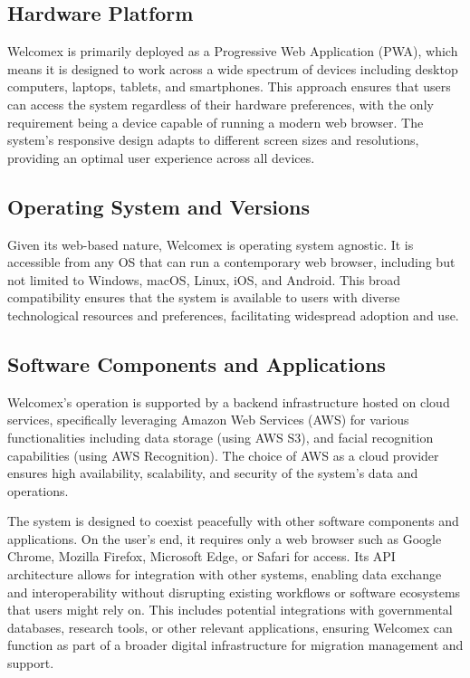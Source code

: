 \documentclass{scrreprt}
\begin{document}
\subsection*{Hardware Platform}
Welcomex is primarily deployed as a Progressive Web Application (PWA), which means it is designed to work across a wide spectrum of devices including desktop computers, laptops, tablets, and smartphones. This approach ensures that users can access the system regardless of their hardware preferences, with the only requirement being a device capable of running a modern web browser. The system's responsive design adapts to different screen sizes and resolutions, providing an optimal user experience across all devices.
\subsection*{Operating System and Versions}
Given its web-based nature, Welcomex is operating system agnostic. It is accessible from any OS that can run a contemporary web browser, including but not limited to Windows, macOS, Linux, iOS, and Android. This broad compatibility ensures that the system is available to users with diverse technological resources and preferences, facilitating widespread adoption and use.
\subsection*{Software Components and Applications}
Welcomex's operation is supported by a backend infrastructure hosted on cloud services, specifically leveraging Amazon Web Services (AWS) for various functionalities including data storage (using AWS S3), and facial recognition capabilities (using AWS Recognition). The choice of AWS as a cloud provider ensures high availability, scalability, and security of the system's data and operations.

The system is designed to coexist peacefully with other software components and applications. On the user's end, it requires only a web browser such as Google Chrome, Mozilla Firefox, Microsoft Edge, or Safari for access. Its API architecture allows for integration with other systems, enabling data exchange and interoperability without disrupting existing workflows or software ecosystems that users might rely on. This includes potential integrations with governmental databases, research tools, or other relevant applications, ensuring Welcomex can function as part of a broader digital infrastructure for migration management and support.
\end{document}
